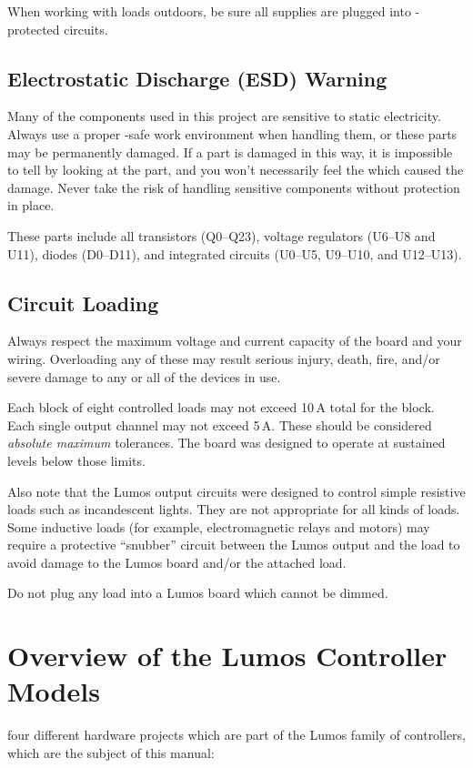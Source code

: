 \documentclass[letterpaper,twoside,onecolumn,openright,final]{memoir}
\begin{document}
When working with loads outdoors, be sure all supplies are plugged into -protected
circuits.

\section{Electrostatic Discharge (ESD) Warning}
Many of the components used in this project are sensitive to static electricity.  Always use a proper
-safe work environment when handling them, or these parts may be permanently damaged.  If
a part is damaged in this way, 
it is impossible to tell by looking at the part, and you won't necessarily
feel the  which caused the damage.  Never take the risk of handling sensitive components
without  protection in place.

These parts include all transistors (Q0--Q23), voltage regulators (U6--U8 and U11), diodes (D0--D11),
and integrated circuits (U0--U5, U9--U10, and U12--U13).

\section{Circuit Loading}
Always respect the maximum voltage and current capacity of the board and your wiring.  Overloading any
of these may result serious injury, death, fire, and/or severe damage to any or all of the devices in use.

Each block of eight controlled loads may not exceed 
10\,A total for the block.  
Each single output channel
may not exceed 5\,A.  These should be considered \emph{absolute maximum} tolerances.  The board was designed
to operate at sustained levels below those limits.

Also note that the Lumos output circuits were designed to control simple resistive loads such as
incandescent lights.  They are not appropriate for all kinds of loads.  Some inductive loads
(for example, electromagnetic relays and motors) may require a protective ``snubber'' circuit
between the Lumos output and the load to avoid damage to the Lumos board and/or the attached load.

Do not plug any load into a Lumos board which cannot be dimmed.

\chapter{Overview of the Lumos Controller Models}
 four different hardware projects which are part of the Lumos
family of controllers, which are the subject of this manual:
\end{document}
